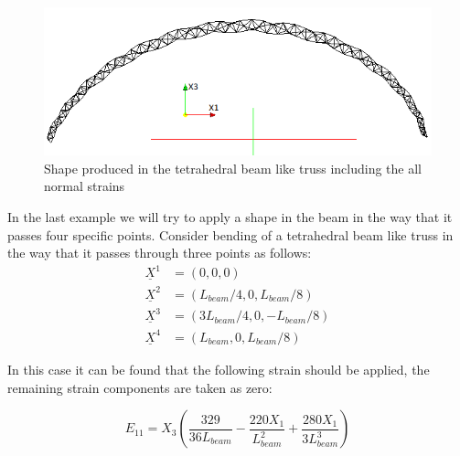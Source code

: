 \begin{figure}  
\centering
\includegraphics[width=6.0in]{./chap_5_active_trusses/images_linear_tetrahedral/tetra_hedral_arc_2_pi_shape_with_pressure.png}
\caption{Shape produced in the tetrahedral beam like truss including the all normal strains}
\label{fig:tetra_hedral_arc_2_pi_shape_with_pressure}
\end{figure} 

In the last example we will try to apply a shape in the beam in the way that it passes four specific points. Consider bending of a tetrahedral beam like truss in the way that it passes through three points as follows: 
\begin{equation}
\begin{aligned} 
\underline X ^1&=(0,0,0) \\
\underline X ^2&=(L_{beam}/4,0,L_{beam}/8) \\
\underline X ^3&=(3 L_{beam}/4,0,-L_{beam}/8) \\
\underline X ^4&=(L_{beam},0,L_{beam}/8)
\end{aligned}
\label{three_points:eqn}
\end{equation}

In this case it can be found that the following strain should be applied, the remaining strain components are taken as zero: 

\begin{equation}
E_{11}=X_3 \left(
\frac{329}{36L_{beam}} -
\frac{220 X_1}{L_{beam}^2} +
\frac{280 X_1}{ 3 L_{beam}^3}  \right)
\label{three_points_strain:eqn}
\end{equation}


